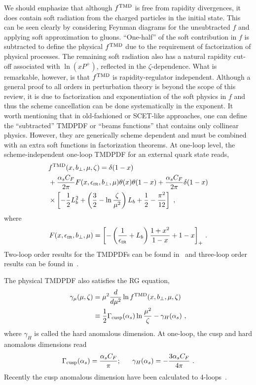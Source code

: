 We should emphasize that although $f^{\rm TMD}$ is free from rapidity divergences, it does contain soft radiation from the
charged particles in the initial state. This can be seen clearly by considering Feynman diagrams for the unsubtracted $f$
and applying soft approximation to gluons. ``One-half'' of the soft contribution in $f$
is subtracted to define the physical $f^{\rm TMD}$ due to the requirement of factorization of
physical processes. The remaining soft radiation also has a natural rapidity cut-off
associated with $\ln(xP^+)$, reflected in the $\zeta$-dependence. What is remarkable,
however, is that $f^{\rm TMD}$ is rapidity-regulator independent. Although a general proof to all
orders in perturbation theory is beyond the scope of this review, it is due to
factorization and exponentiation of the soft physics in $f$ and thus the scheme cancellation
can be done systematically in the exponent. It worth mentioning that in old-fashioned or SCET-like approaches, one can define the ``subtracted'' TMDPDF or ``beams functions'' that contains only collinear physics. However, they are generically scheme dependent and must be combined with an extra soft functions in factorization theorems. At one-loop level, the scheme-independent one-loop TMDPDF for an external quark state reads,
\begin{align}\label{eq:ftmd_1loop}
	&f^{\rm TMD}(x,b_\perp,\mu,\zeta) = \delta(1-x)\nonumber \\
	&+\frac{\alpha_sC_F}{2\pi}F(x,\epsilon_{\tiny\mbox{IR}},b_\perp,\mu)\theta(x)\theta(1-x)+\frac{\alpha_sC_F}{2\pi}\delta(1-x)\nonumber \\
	&\times \left[-\frac{1}{2}L_b^2+\left(\frac{3}{2}-\ln \frac{\zeta}{\mu^2}\right)L_b+\frac{1}{2}-\frac{\pi^2}{12}\right] \ ,
\end{align}
where
\begin{align}
	F(x,\epsilon_{\tiny\mbox{IR}},b_\perp,\mu)=\left[-\left(\frac{1}{\epsilon_{\tiny\mbox{IR}}}+L_b\right)\frac{1+x^2}{1-x}+1-x\right]_+\,.
\end{align}
Two-loop order results for the TMDPDFs can be found in~\cite{Catani:2011kr,Catani:2012qa,Gehrmann:2014yya,Luebbert:2016itl,Echevarria:2016scs,Luo:2019hmp} and three-loop order results can be found in~\cite{Luo:2019szz}.

The physical TMDPDF also satisfies the RG equation,
\begin{align}
	\gamma_\mu(\mu,\zeta)&=\mu^2\frac{d}{d\mu^2}\ln f^{\rm TMD}(x,b_\perp,\mu,\zeta) \nonumber \\
	&\equiv \frac{1}{2}\Gamma_{\rm cusp}(\alpha_s)\ln \frac{\mu^2}{\zeta}-\gamma_H(\alpha_s)  \ ,
\end{align}
where $\gamma_H$ is called the hard anomalous dimension. At one-loop, the cusp and hard anomalous dimensions read
\begin{align}\label{eq:ad_hard}
	\Gamma_{\rm cusp}(\alpha_s) =\frac{\alpha_s C_F}{\pi}; ~~~~~
	\gamma_H(\alpha_s) =-\frac{3\alpha_sC_F}{4\pi}  \ .
\end{align}
Recently the cusp anomalous dimension have been calculated to 4-loops~\cite{Henn:2019swt,vonManteuffel:2020vjv}.

